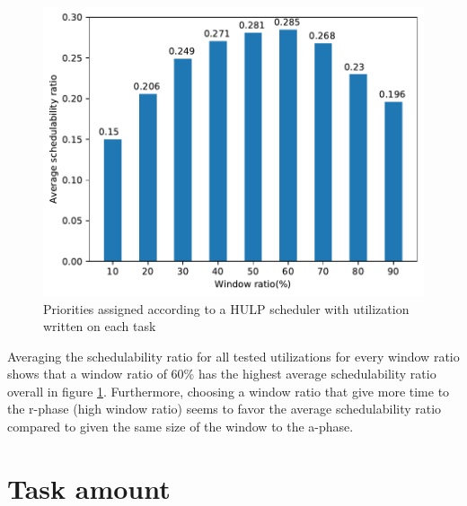 \documentclass{kththesis}
\begin{document}
\begin{figure}[H]

    \centering

    \includegraphics[width=1.0\linewidth]{images/window_ratio_averages.pdf}

    \caption{Priorities assigned according to a HULP scheduler with utilization written on each task}

    \label{fig:window_ratio_averages}

\end{figure}

Averaging the schedulability ratio for all tested utilizations for every window ratio shows that a
window ratio of 60\% has the highest average schedulability ratio overall in figure
\ref{fig:window_ratio_averages}. Furthermore, choosing a window ratio that give more time to the
\acrshort{r}-phase (high window ratio) seems to favor the average schedulability ratio compared to
given the same size of the window to the \acrshort{a}-phase.

\section{Task amount}
\end{document}
